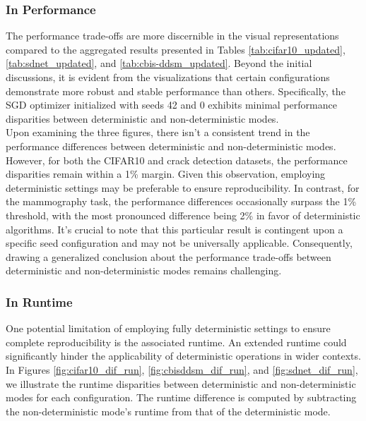 \subsubsection*{In Performance}

The performance trade-offs are more discernible in the visual representations compared to the aggregated results presented in Tables \ref{tab:cifar10_updated}, \ref{tab:sdnet_updated}, and \ref{tab:cbis-ddsm_updated}. Beyond the initial discussions, it is evident from the visualizations that certain configurations demonstrate more robust and stable performance than others. Specifically, the SGD optimizer initialized with seeds 42 and 0 exhibits minimal performance disparities between deterministic and non-deterministic modes.\\

Upon examining the three figures, there isn't a consistent trend in the performance differences between deterministic and non-deterministic modes. However, for both the CIFAR10 and crack detection datasets, the performance disparities remain within a 1\% margin. Given this observation, employing deterministic settings may be preferable to ensure reproducibility. In contrast, for the mammography task, the performance differences occasionally surpass the 1\% threshold, with the most pronounced difference being 2\% in favor of deterministic algorithms. It's crucial to note that this particular result is contingent upon a specific seed configuration and may not be universally applicable. Consequently, drawing a generalized conclusion about the performance trade-offs between deterministic and non-deterministic modes remains challenging.\\

\subsubsection*{In Runtime}

One potential limitation of employing fully deterministic settings to ensure complete reproducibility is the associated runtime. An extended runtime could significantly hinder the applicability of deterministic operations in wider contexts. In Figures \ref{fig:cifar10_dif_run}, \ref{fig:cbisddsm_dif_run}, and \ref{fig:sdnet_dif_run}, we illustrate the runtime disparities between deterministic and non-deterministic modes for each configuration. The runtime difference is computed by subtracting the non-deterministic mode's runtime from that of the deterministic mode.\\

